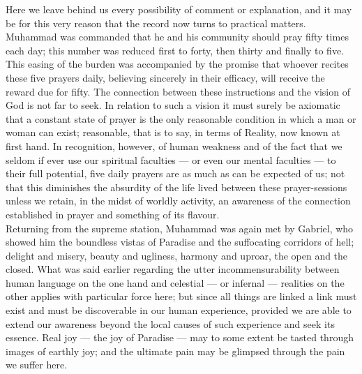 \documentclass[10pt, twoside]{book}
\begin{document}
Here we leave behind us every possibility of comment or explanation, and it may be for this very 
reason that the record now turns to practical matters. Muhammad was commanded that he and his 
community should pray fifty times each day; this number was reduced first to forty, then thirty and 
finally to five. This easing of the burden was accompanied by the promise that whoever recites these 
five prayers daily, believing sincerely in their efficacy, will receive the reward due for fifty. The 
connection between these instructions and the vision of God is not far to seek. In relation to such a 
vision it must surely be axiomatic that a constant state of prayer is the only reasonable condition 
in which a man or woman can exist; reasonable, that is to say, in terms of Reality, now known at 
first hand. In recognition, however, of human weakness and of the fact that we seldom if ever use 
our spiritual faculties --- or even our mental faculties --- to their full potential, five daily prayers 
are as much as can be expected of us; not that this diminishes the absurdity of the life lived 
between these prayer\hyp{}sessions unless we retain, in the midst of worldly activity, an awareness of the 
connection established in prayer and something of its flavour. \\

Returning from the supreme station, Muhammad was again met by Gabriel, who showed him the boundless vistas of Paradise and the suffocating corridors of hell; delight and misery, beauty and ugliness, 
harmony and uproar, the open and the closed. What was said earlier regarding the utter 
incommensurability between human language on the one hand and celestial --- or infernal --- realities on 
the other applies with particular force here; but since all things are linked a link must exist and 
must be discoverable in our human experience, provided we are able to extend our awareness beyond the 
local causes of such experience and seek its essence. Real joy --- the joy of Paradise --- may to some 
extent be tasted through images of earthly joy; and the ultimate pain may be glimpsed through the 
pain we suffer here. \\
\end{document}
